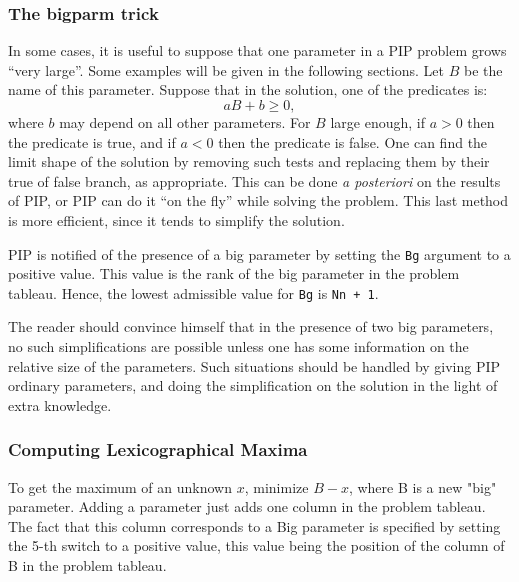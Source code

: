 \documentclass[12pt,a4paper]{article}
\begin{document}
\subsubsection{The bigparm trick}

In some cases, it is useful to suppose that one parameter in a PIP problem
grows ``very large''. Some examples will be given in the following sections.
Let $B$ be the name of this parameter. Suppose that in the solution, one
of the predicates is:
\[ a B + b \ge 0 ,\]
where $b$ may depend on all other parameters. For $B$ large enough, if $a > 0$
then the predicate is true, and if $a < 0$ then the predicate is false.
One can find the limit shape of the solution by removing such tests and 
replacing them by their true of false branch, as appropriate. This can be done
{\sl a posteriori\/} on the results of PIP, or PIP can do it ``on the fly''
while solving the problem. This last method is more efficient, since it
tends to simplify the solution.

PIP is notified of the presence of a big parameter by setting the {\tt Bg}
argument to a positive value. This value is the rank of the big parameter
in the problem tableau. Hence, the lowest admissible value for {\tt Bg}
is {\tt Nn + 1}.

The reader should convince himself that in the presence of two big
parameters, no such simplifications are possible unless one has some
information on the relative size of the parameters. Such situations
should be handled by giving PIP ordinary parameters, and doing the
simplification on the solution in the light of extra knowledge.

\subsubsection{Computing Lexicographical Maxima}
\label{maximum}
To get the maximum of an unknown $x$,  minimize $B - x$, where
B is a new "big" parameter. Adding a parameter just adds one column
in the problem tableau. The fact that this column corresponds to a Big
parameter is specified by setting the 5-th switch to a positive value,
this value being the position of the column of B in the problem
tableau.
\end{document}
